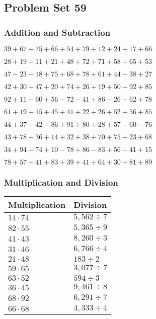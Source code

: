 \hypertarget{problem-set-59}{%
\subsection{Problem Set 59}\label{problem-set-59}}

\hypertarget{addition-and-subtraction}{%
\subsubsection{Addition and
Subtraction}\label{addition-and-subtraction}}

\(39+67+75+66+54+79+12+24+17+66\)

\(28+19+11+21+48+72+71+58+65+53\)

\(47-23-18+75+68+78+61+44-38+27\)

\(42+30+47+20+74+26+19+50+92+85\)

\(92+11+60+56-72-41+86-26+62+78\)

\(61+19+15+45+41+22+26+52+56+85\)

\(44+37+42-86+91+80+28+57-60-76\)

\(43+78+36+14+32+38+70+75+23+68\)

\(34+94+74+10-78+86-83+56-41+15\)

\(78+57+41+83+39+41+64+30+81+89\)

\hypertarget{multiplication-and-division}{%
\subsubsection{Multiplication and
Division}\label{multiplication-and-division}}

\begin{longtable}[]{@{}ll@{}}
\toprule
Multiplication & Division\tabularnewline
\midrule
\endhead
\(14\cdot74\) & \(5,562÷7\)\tabularnewline
\(82\cdot55\) & \(5,365÷9\)\tabularnewline
\(41\cdot43\) & \(8,260÷3\)\tabularnewline
\(31\cdot46\) & \(6,766÷4\)\tabularnewline
\(21\cdot48\) & \(183÷2\)\tabularnewline
\(59\cdot65\) & \(3,077÷7\)\tabularnewline
\(63\cdot52\) & \(594÷3\)\tabularnewline
\(36\cdot45\) & \(9,461÷8\)\tabularnewline
\(68\cdot92\) & \(6,291÷7\)\tabularnewline
\(66\cdot68\) & \(4,333÷4\)\tabularnewline
\bottomrule
\end{longtable}
